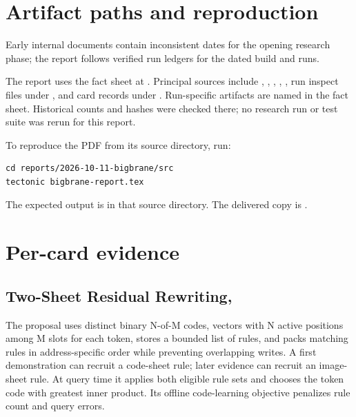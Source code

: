 \section{Artifact paths and reproduction}

Early internal documents contain inconsistent dates for the opening research phase; the report follows verified run ledgers for the dated build and runs.


The report uses the fact sheet at . Principal sources include , , , , , run inspect files under , and card records under . Run-specific artifacts are named in the fact sheet. Historical counts and hashes were checked there; no research run or test suite was rerun for this report.

To reproduce the PDF from its source directory, run:
\begin{verbatim}
cd reports/2026-10-11-bigbrane/src
tectonic bigbrane-report.tex
\end{verbatim}
The expected output is  in that source directory. The delivered copy is .

\section{Per-card evidence}

\subsection{Two-Sheet Residual Rewriting, }

The proposal uses distinct binary N-of-M codes, vectors with N active positions among M slots for each token, stores a bounded list of rules, and packs matching rules in address-specific order while preventing overlapping writes. A first demonstration can recruit a code-sheet rule; later evidence can recruit an image-sheet rule. At query time it applies both eligible rule sets and chooses the token code with greatest inner product. Its offline code-learning objective penalizes rule count and query errors.

